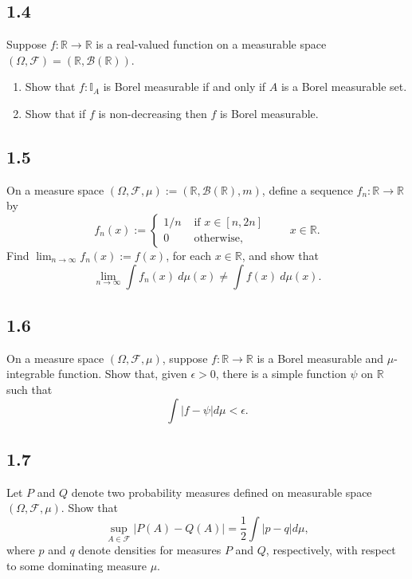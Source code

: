 \documentclass[12pt]{article}
\begin{document}
\subsection*{1.4}
\begin{tcolorbox}
Suppose $f : \mathbb{R} \rightarrow \mathbb{R}$ is a real-valued function on a measurable space $(\Omega, \mathcal{F}) = (\mathbb{R},
\mathcal{B}(\mathbb{R}))$. 
\begin{enumerate}[label=(\alph*)]
\item Show that $f : \mathbb{I}_{A}$ is Borel measurable if and only if $A$ is a Borel measurable set. 
\item Show that if $f$ is non-decreasing then $f$ is Borel measurable.
\end{enumerate}
\end{tcolorbox}


\subsection*{1.5}
\begin{tcolorbox}
On a measure space $(\Omega, \mathcal{F}, \mu) := (\mathbb{R}, \mathcal{B}(\mathbb{R}), m)$, define a sequence $f_{n} : \mathbb{R} \rightarrow
\mathbb{R}$ by 
\[ f_{n}(x) := \left\{ \begin{array}{cl}
1/n &  \text{ if } x \in [n,2n] \\
0 &  \text{ otherwise,}
\end{array} \right. \qquad x \in \mathbb{R}. \]
Find $\lim_{n\rightarrow\infty}f_{n}(x) := f(x)$, for each $x \in \mathbb{R}$, and show that 
\[ \lim_{n\rightarrow\infty}\int f_{n}(x)\ d\mu(x) \neq \int f(x)\ d\mu(x). \]
\end{tcolorbox}



\subsection*{1.6}
\begin{tcolorbox}
On a measure space $(\Omega, \mathcal{F}, \mu)$, suppose $f : \mathbb{R} \rightarrow \mathbb{R}$ is a Borel measurable and $\mu$-integrable function.
Show that, given $\epsilon > 0$, there is a simple function $\psi$ on $\mathbb{R}$ such that 
\[ \int |f - \psi | d\mu < \epsilon. \]
\end{tcolorbox}



\subsection*{1.7}
\begin{tcolorbox}
Let $P$ and $Q$ denote two probability measures defined on measurable space $(\Omega, \mathcal{F}, \mu)$. Show that 
\[ \sup_{A \in \mathcal{F}}|P(A) - Q(A)| = \frac{1}{2} \int |p - q|d\mu, \]
where $p$ and $q$ denote densities for measures $P$ and $Q$, respectively, with respect to some dominating measure $\mu$.
\end{tcolorbox}
\end{document}
